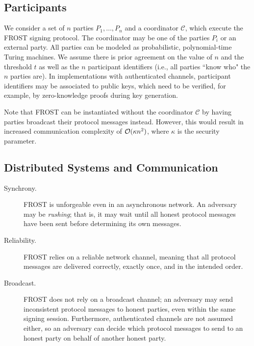 \subsection{Participants}
We consider a set of $n$ parties
$P_1, \dots, P_n$ and a coordinator $\mathcal{C}$, which execute the FROST signing protocol.
The coordinator may be one of the parties $P_i$ or an external party.
All parties can be modeled as probabilistic, polynomial-time Turing machines.
We assume there is prior agreement on the value of $n$ and the threshold $t$ as well as the $n$ participant identifiers (i.e., all parties ``know who" the $n$ parties are).
In implementations with authenticated channels, participant identifiers may be associated to public keys, which need to be verified, for example, by zero-knowledge proofs during key generation.

Note that FROST can be instantiated without the coordinator $\mathcal{C}$ by having parties broadcast their protocol messages instead.  However, this would result in increased communication complexity of $\mathcal{O}(\kappa n^2)$, where $\kappa$ is the security parameter.

\subsection{Distributed Systems and Communication}

\begin{description}

\item[Synchrony.] FROST is unforgeable even in an asynchronous network. An adversary may be \emph{rushing}; that is, it may wait until all honest protocol messages have been sent before determining its own messages.

\item[Reliability.] FROST relies on a reliable network channel, meaning that all protocol messages are delivered correctly, exactly once, and in the intended order.  

\item[Broadcast.] FROST does not rely on a broadcast channel; an adversary may send inconsistent protocol messages to honest parties, even within the same signing session.  Furthermore, authenticated channels are not assumed either, so an adversary can decide which protocol messages to send to an honest party on behalf of another honest party.

\end{description}

